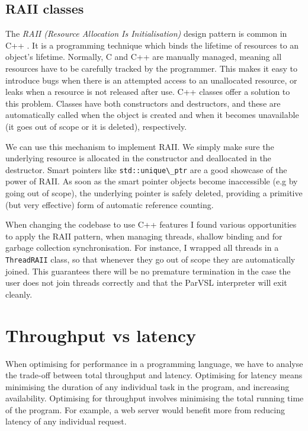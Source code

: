 \subsection{RAII classes}
\label{sec:raii}
The \emph{RAII (Resource Allocation Is Initialisation)} design pattern is common in C++ \cite[Item~37]{effective-cpp}.
It is a programming technique which binds the lifetime of resources to an object's lifetime. Normally,
C and C++ are manually managed, meaning all resources have to be carefully tracked by the programmer.
This makes it easy to introduce bugs when there is an attempted access to an unallocated resource,
or leaks when a resource is not released after use. C++ classes offer a solution to this problem.
Classes have both constructors and destructors, and these are automatically called when the object
is created and when it becomes unavailable (it goes out of scope or it is deleted), respectively.

We can use this mechanism to implement RAII. We simply make sure
the underlying resource is allocated in the constructor and deallocated in the destructor.
Smart pointers like \verb|std::unique\_ptr| are a good showcase of the power of RAII. As soon as the
smart pointer objects become inaccessible (e.g by going out of scope), the underlying pointer
is safely deleted, providing a primitive (but very effective) form of automatic reference counting.

When changing the codebase to use C++ features I found various opportunities to apply the RAII pattern,
when managing threads, shallow binding and for garbage collection synchronisation. For instance,
I wrapped all threads in a \verb|ThreadRAII| class, so that whenever they go out of scope they are automatically
joined. This guarantees there will be no premature termination in the case the
user does not join threads correctly and that the ParVSL interpreter will exit cleanly.

\section{Throughput vs latency}
When optimising for performance in a programming language, we have to analyse the trade-off between
total throughput and latency. Optimising for latency means minimising the duration of any individual
task in the program, and increasing availability. Optimising for throughput involves minimising the
total running time of the program. For example, a web server would benefit more from reducing latency
of any individual request.

